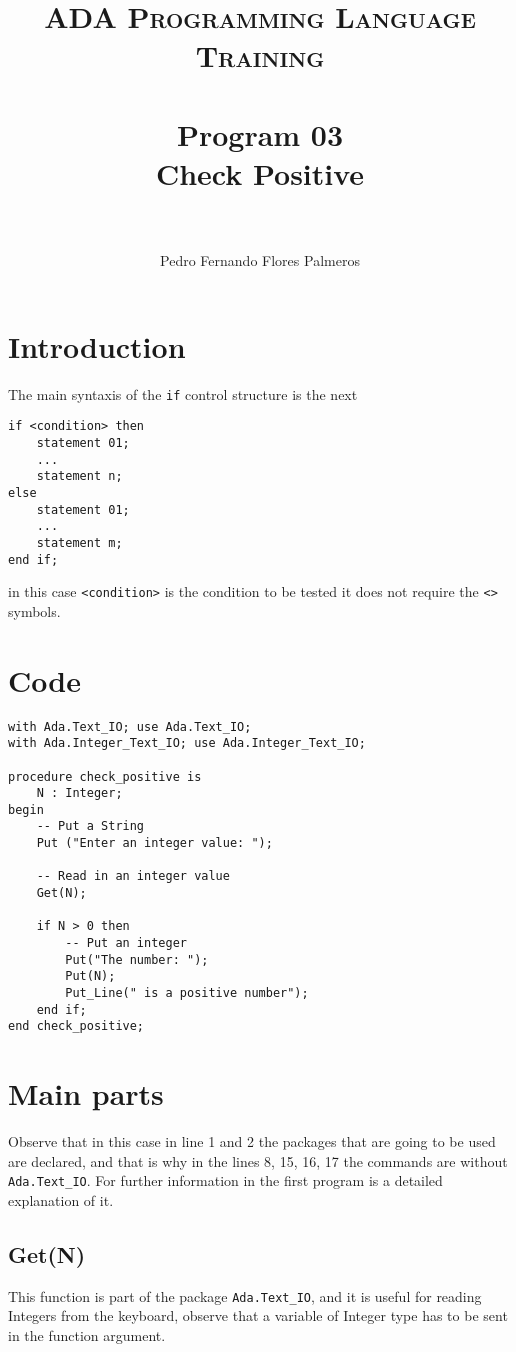 \documentclass[paper=a4, fontsize=11pt]{scrartcl} %
\title{	
\normalfont \normalsize 
\textsc{ADA Programming Language Training} \\ [25pt] %
\horrule{0.5pt} \\[0.4cm] %
\huge Program 03\\ Check Positive \\ %
\horrule{2pt} \\[0.5cm] %
}
\author{Pedro Fernando Flores Palmeros} %
\date{} %
\numberwithin{equation}{section} %
\numberwithin{figure}{section} %
\numberwithin{table}{section} %
\begin{document}
\maketitle %
 

\section{Introduction}
The main syntaxis of the \verb|if| control structure is the next

\begin{lstlisting}
if <condition> then
	statement 01;
	...
	statement n;
else
	statement 01;
	...
	statement m;
end if;
\end{lstlisting}
in this case \verb|<condition>| is the condition to be tested it does not require the \verb|<>| symbols.

\section{Code}
\begin{lstlisting}
with Ada.Text_IO; use Ada.Text_IO;
with Ada.Integer_Text_IO; use Ada.Integer_Text_IO;

procedure check_positive is 
    N : Integer;
begin
    -- Put a String
    Put ("Enter an integer value: ");

    -- Read in an integer value
    Get(N);

    if N > 0 then
        -- Put an integer
        Put("The number: ");
        Put(N);
        Put_Line(" is a positive number");
    end if;
end check_positive;
\end{lstlisting}

\section{Main parts}
Observe that in this case in line 1 and 2 the packages that are going to be used are declared, and that is why in the lines 8, 15, 16, 17 the commands are without \verb|Ada.Text_IO|. For further information in the first program is a detailed explanation of it. 

\subsection{Get(N)}
This function is part of the package \verb|Ada.Text_IO|, and it is useful for reading Integers from the keyboard, observe that a variable of Integer type has to be sent in the function argument. 
\end{document}
